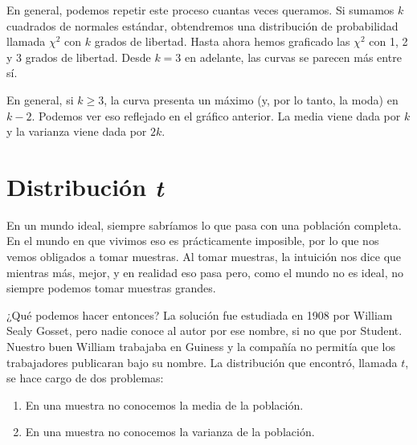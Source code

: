 En general, podemos repetir este proceso cuantas veces queramos. Si sumamos \(k\) cuadrados de normales estándar, obtendremos una distribución de probabilidad llamada \(\chi^2\) con \(k\) grados de libertad. Hasta ahora hemos graficado las \(\chi^2\) con 1, 2 y 3 grados de libertad. Desde \(k=3\) en adelante, las curvas se parecen más entre sí.
\begin{center}
\end{center}

En general, si \(k\geq 3\), la curva presenta un máximo (y, por lo tanto, la moda) en \(k-2\). Podemos ver eso reflejado en el gráfico anterior. La media viene dada por \(k\) y la varianza viene dada por \(2k\).

\section{Distribución \emph{t}}

En un mundo ideal, siempre sabríamos lo que pasa con una población completa. En el mundo en que vivimos eso es prácticamente imposible, por lo que nos vemos obligados a tomar muestras. Al tomar muestras, la intuición nos dice que mientras más, mejor, y en realidad eso pasa pero, como el mundo no es ideal, no siempre podemos tomar muestras grandes.

¿Qué podemos hacer entonces? La solución fue estudiada en 1908 por William Sealy Gosset, pero nadie conoce al autor por ese nombre, si no que por Student. Nuestro buen William trabajaba en Guiness y la compañía no permitía que los trabajadores publicaran bajo su nombre. La distribución que encontró, llamada \(t\), se hace cargo de dos problemas:
\begin{enumerate}
\item En una muestra no conocemos la media de la población.
\item En una muestra no conocemos la varianza de la población.
\end{enumerate}


